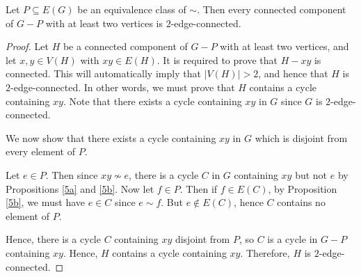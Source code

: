 \documentclass{unswmaths}
\begin{document}
\begin{proposition}[Part (d)]
\label{5d}
    Let $P \subseteq E(G)$ be an equivalence class of $\sim$. Then every connected
    component of $G-P$ with at least two vertices is $2$-edge-connected.
\end{proposition}
\begin{proof}
    Let $H$ be a connected component of $G-P$ with at least two vertices, and 
    let $x,y \in V(H)$ with $xy \in E(H)$. It is required to prove that $H - xy$ is connected. 
    This will automatically imply that $|V(H)| > 2$, and hence that $H$ is
    $2$-edge-connected.
    In other words, we must prove that $H$ contains a cycle containing $xy$. 
    Note that there exists a cycle containing $xy$ in $G$ since $G$ is $2$-edge-connected.
    
    We now show that there exists a cycle containing $xy$ in $G$ which is disjoint
    from every element of $P$. 
    
    Let $e \in P$. Then since $xy \nsim e$, there is a cycle $C$ in $G$ 
    containing $xy$ but not $e$ by Propositions \ref{5a} and \ref{5b}. 
    Now let $f \in P$. Then if $f \in E(C)$, by Proposition \ref{5b},
    we must have $e \in C$ since $e \sim f$. But $e \notin E(C)$, hence
    $C$ contains no element of $P$.
    
%    
    
    Hence, there is a cycle $C$ containing $xy$ disjoint from $P$, so $C$ is a cycle
    in $G-P$ containing $xy$. Hence, $H$ contains a cycle containing $xy$. Therefore,
    $H$ is $2$-edge-connected.
\end{proof}
\end{document}
